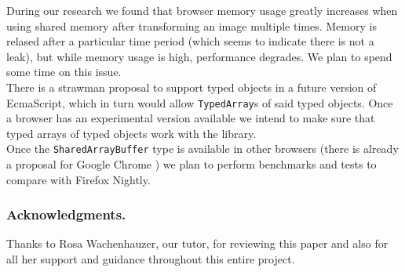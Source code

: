 \documentclass[runningheads,a4paper]{llncs}
\begin{document}
During our research we found that browser memory usage greatly increases when using shared memory after transforming an image multiple times. Memory is relased after a particular time period (which seems to indicate there is not a leak), but while memory usage is high, performance degrades. We plan to spend some time on this issue.\\

There is a strawman proposal to support typed objects \cite{typed-objects} in a future version of EcmaScript, which in turn would allow \verb+TypedArray+s of said typed objects. Once a browser has an experimental version available we intend to make sure that typed arrays of typed objects work with the library.\\

Once the \verb+SharedArrayBuffer+ type is available in other browsers (there is already a proposal for Google Chrome \cite{sab-chrome}) we plan to perform benchmarks and tests to compare with Firefox Nightly.

\subsubsection*{Acknowledgments.}
Thanks to Rosa Wachenhauzer, our tutor, for reviewing this paper and also for all her support and guidance throughout this entire project.
\end{document}
